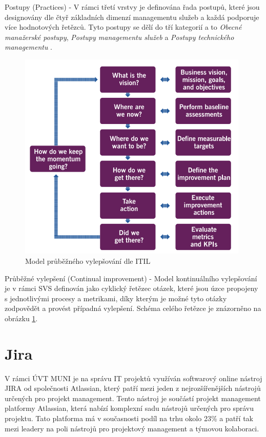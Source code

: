 \documentclass[
  digital,     %
  twoside,     %
  lof,         %
  lot,         %
]{fithesis4}
\begin{document}
\begin{compactitem}
    \item Postupy (Practices) - V rámci třetí vrstvy je definována řada postupů, které jsou designovány dle čtyř základních dimenzí managementu služeb a každá podporuje více hodnotových řetězců. Tyto postupy se dělí do tří kategorií a to \emph{Obecné manažerské postupy}, \emph{Postupy managementu služeb} a \emph{Postupy technického managementu} \parencite[s.~22]{Cartlidge2020}.

    \begin{figure}[h]
        \begin{center}
            \includegraphics[width=11cm]{img/continual_improvement.png}
        \end{center}
        \caption{Model průběžného vylepšování dle ITIL \parencite[s.~24]{Cartlidge2020}}
        \label{fig:svs_continual_improvement}
    \end{figure} 
    \item Průběžné vylepšení (Continual improvement) - Model kontinuálního vylepšování je v rámci SVS definován jako cyklický řetězec otázek, které jsou úzce propojeny s jednotlivými procesy a metrikami, díky kterým je možné tyto otázky zodpovědět a provést případná vylepšení. Schéma celého řetězce je znázorněno na obrázku \ref{fig:svs_continual_improvement}.
\end{compactitem}


\section{Jira}
\label{Jira}
V rámci ÚVT MUNI je na správu IT projektů využíván softwarový online nástroj JIRA od společnosti Atlassian, který patří mezi jeden z nejrozšířenějších nástrojů určených pro projekt management. Tento nástroj je součástí projekt management platformy Atlassian, která nabízí komplexní sadu nástrojů určených pro správu projektu. Tato platforma má v současnosti podíl na trhu okolo 23\% \parencite{atlassian} a patří tak mezi leadery na poli nástrojů pro projektový management a týmovou kolaboraci.
\end{document}
